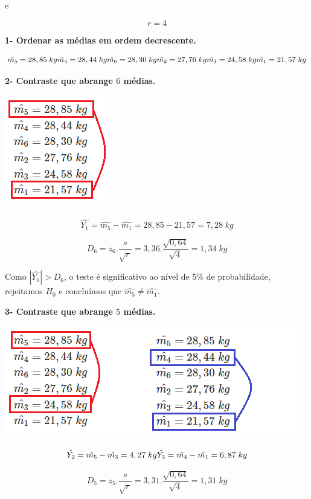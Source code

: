 \documentclass[
]{book}
\begin{document}
e

\[
r=4
\]

\textbf{1- Ordenar as médias em ordem decrescente.}

\[
\hat{m_5} = 28,85\;kg \\
\hat{m_4} = 28,44\;kg \\
\hat{m_6} = 28,30\;kg \\
\hat{m_2} = 27,76\;kg \\
\hat{m_3} = 24,58\;kg \\
\hat{m_1} = 21,57\;kg 
\]

\textbf{2- Contraste que abrange \(6\) médias.}

\includegraphics{m6.png}

\[
\hat{Y_1} = \hat{m_5} - \hat{m_1} = 28,85-21,57=7,28\;kg
\]

\[
D_{6} = z_6.\frac{s}{\sqrt{r}} = 3,36.\frac{\sqrt{0,64}}{\sqrt{4}} = 1,34\;kg
\]

Como \(|\hat{Y_1}|>D_6\), o teste é significativo ao nível de 5\% de probabilidade, rejeitamos \(H_0\) e concluímos que \(\hat{m_5} \neq \hat{m_1}\).

\textbf{3- Contraste que abrange \(5\) médias.}

\includegraphics{m5.png}

\[
\hat{Y_2} = \hat{m_5} - \hat{m_3} = 4,27\;kg \\
\hat{Y_3} = \hat{m_4} - \hat{m_1} = 6,87\;kg 
\]

\[
D_{5} = z_5.\frac{s}{\sqrt{r}} = 3,31.\frac{\sqrt{0,64}}{\sqrt{4}} = 1,31\;kg
\]
\end{document}
